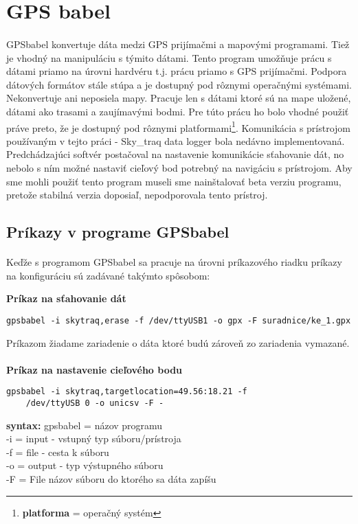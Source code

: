 \section{GPS babel}
\paragraph{}GPSbabel konvertuje dáta medzi GPS prijímačmi a mapovými programami. Tiež je
vhodný na manipuláciu s týmito dátami.
Tento program umožňuje prácu s dátami priamo na úrovni hardvéru t.j. prácu
priamo s GPS prijímačmi. Podpora dátových formátov stále stúpa a je dostupný pod
rôznymi operačnými systémami.
Nekonvertuje ani neposiela mapy. Pracuje len s dátami ktoré sú na mape uložené,
dátami ako trasami a zaujímavými bodmi. 
Pre túto prácu ho bolo vhodné použiť práve preto, že je dostupný pod rôznymi platformami\footnote{\textbf{platforma} = operačný systém}.
Komunikácia s prístrojom používaným v tejto práci - Sky\_traq data
logger bola nedávno implementovaná. Predchádzajúci softvér postačoval
na nastavenie komunikácie sťahovanie dát, no nebolo s ním možné nastaviť cieľový
bod potrebný na navigáciu s prís\-tro\-jom.
Aby sme mohli použiť tento program museli sme nainštalovať beta verziu programu,
pretože stabilná verzia doposiaľ, nepodporovala tento prístroj.

\subsection{Príkazy v programe GPSbabel}
\paragraph{}Keďže s programom GPSbabel sa pracuje na úrovni príkazového riadku príkazy na
konfiguráciu sú zadávané takýmto spôsobom:

\begin{center}
\textbf{Príkaz na sťahovanie dát}
\begin{verbatim}
gpsbabel -i skytraq,erase -f /dev/ttyUSB1 -o gpx -F suradnice/ke_1.gpx
\end{verbatim}
Príkazom žiadame zariadenie o dáta ktoré budú zároveň zo zariadenia vymazané.
\paragraph{}
\textbf{Príkaz na nastavenie cieľového bodu}
\begin{verbatim}
gpsbabel -i skytraq,targetlocation=49.56:18.21 -f 
    /dev/ttyUSB 0 -o unicsv -F -  
\end{verbatim}
\textbf{syntax:} gpsbabel = názov programu\\
-i = input - vstupný typ súboru/prístroja\\
-f = file - cesta k súboru\\
-o = output - typ výstupného súboru \\
-F = File názov súboru do ktorého sa dáta zapíšu\\
\end{center}

